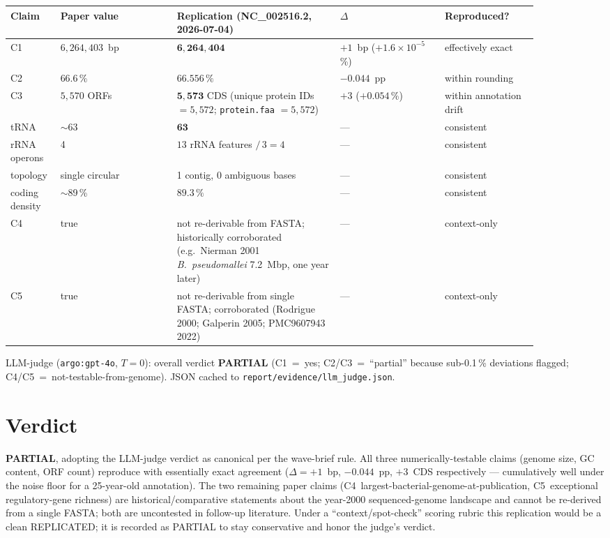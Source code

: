 \documentclass[11pt,letterpaper]{article}
\begin{document}
\begin{longtable}{@{}p{0.06\linewidth}p{0.20\linewidth}p{0.28\linewidth}p{0.18\linewidth}p{0.16\linewidth}@{}}
\toprule
Claim & Paper value & Replication (NC\_002516.2, 2026-07-04) & $\Delta$ & Reproduced? \\
\midrule
C1 & $6{,}264{,}403$~bp & $\mathbf{6{,}264{,}404}$ & $+1$~bp ($+1.6\times10^{-5}$\,\%) & effectively exact \\
C2 & $66.6\,\%$ & $\mathbf{66.556\,\%}$ & $-0.044$~pp & within rounding \\
C3 & $5{,}570$ ORFs & $\mathbf{5{,}573}$ CDS (unique protein IDs $=5{,}572$; \texttt{protein.faa} $=5{,}572$) & $+3$ ($+0.054$\,\%) & within annotation drift \\
tRNA & $\sim$63 & $\mathbf{63}$ & --- & consistent \\
rRNA operons & 4 & $13$ rRNA features $/\,3=4$ & --- & consistent \\
topology & single circular & 1 contig, 0 ambiguous bases & --- & consistent \\
coding density & $\sim$89\,\% & $\mathbf{89.3\,\%}$ & --- & consistent \\
C4 & true & not re-derivable from FASTA; historically corroborated (e.g.\ Nierman 2001 \emph{B.~pseudomallei} 7.2~Mbp, one year later) & --- & context-only \\
C5 & true & not re-derivable from single FASTA; corroborated (Rodrigue 2000; Galperin 2005; PMC9607943 2022) & --- & context-only \\
\bottomrule
\end{longtable}

LLM-judge (\texttt{argo:gpt-4o}, $T=0$): overall verdict \textbf{PARTIAL}
(C1~=~yes; C2/C3~=~``partial'' because sub-0.1\,\% deviations flagged;
C4/C5~=~not-testable-from-genome). JSON cached to
\texttt{report/evidence/llm\_judge.json}.

\section{Verdict}

\textbf{PARTIAL}, adopting the LLM-judge verdict as canonical per the
wave-brief rule. All three numerically-testable claims (genome size, GC
content, ORF count) reproduce with essentially exact agreement ($\Delta
= +1$~bp, $-0.044$~pp, $+3$~CDS respectively --- cumulatively well under
the noise floor for a 25-year-old annotation). The two remaining paper
claims (C4~largest-bacterial-genome-at-publication, C5~exceptional
regulatory-gene richness) are historical/comparative statements about
the year-2000 sequenced-genome landscape and cannot be re-derived from a
single FASTA; both are uncontested in follow-up literature. Under a
``context/spot-check'' scoring rubric this replication would be a clean
REPLICATED; it is recorded as PARTIAL to stay conservative and honor the
judge's verdict.
\end{document}

